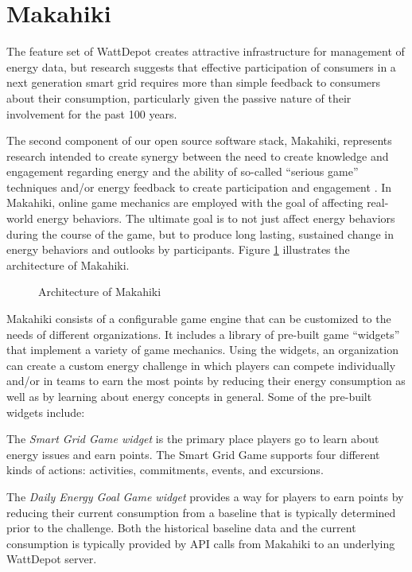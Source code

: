 \section{Makahiki}
The feature set of WattDepot creates attractive infrastructure for management of energy data, but research suggests that effective participation of consumers in a next generation smart grid requires more than simple feedback to consumers about their consumption, particularly given the passive nature of their involvement for the past 100 years.

The second component of our open source software stack, Makahiki, represents research intended to create synergy between the need to create knowledge and engagement regarding energy and the ability of so-called ``serious game'' techniques and/or energy feedback to create participation and engagement \cite{Deterding2011mt,darby-review-2006,Faruqui09,petersen-dorm-energy-reduction}. In Makahiki, online game mechanics are employed with the goal of affecting real-world energy behaviors.  The ultimate goal is to not just affect energy behaviors during the course of the game, but to produce long lasting, sustained change in energy behaviors and outlooks by participants. Figure \ref{fig:makahiki-architecture} illustrates the architecture of Makahiki.

\begin{figure}
\begin{center}
\end{center}
\caption{Architecture of Makahiki}
\label{fig:makahiki-architecture}
\end{figure}

Makahiki consists of a configurable game engine that can be customized to the needs of different organizations.  It includes a library of pre-built game ``widgets'' that implement a variety of game mechanics.  Using the widgets, an organization can create a custom energy challenge in which players can compete individually and/or in teams to earn the most points by reducing their energy consumption as well as by learning about energy concepts in general.  Some of the pre-built widgets include:

The {\em Smart Grid Game widget} is the primary place players go to learn about energy issues and earn points.  The Smart Grid Game supports four different kinds of actions: activities, commitments, events, and excursions.

The {\em Daily Energy Goal Game widget} provides a way for players to earn points by reducing their current consumption from a baseline that is typically determined prior to the challenge. Both the historical baseline data and the current consumption is typically provided by API calls from Makahiki to an underlying WattDepot server.

